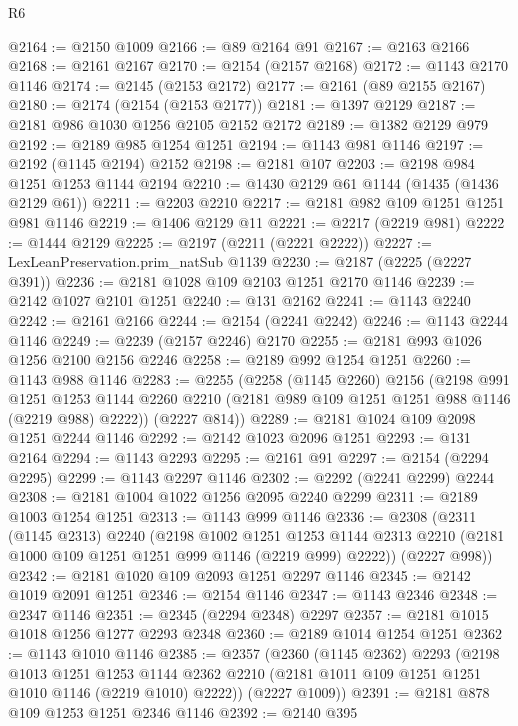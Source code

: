 \begin{lexlean}{R6}
\begin{coremodule}
@2164 := @2150 @1009
@2166 := @89 @2164 @91
@2167 := @2163 @2166
@2168 := @2161 @2167
@2170 := @2154 (@2157 @2168)
@2172 := @1143 @2170 @1146
@2174 := @2145 (@2153 @2172)
@2177 := @2161 (@89 @2155 @2167)
@2180 := @2174 (@2154 (@2153 @2177))
@2181 := @1397 @2129
@2187 := @2181 @986 @1030 @1256 @2105 @2152 @2172
@2189 := @1382 @2129 @979
@2192 := @2189 @985 @1254 @1251
@2194 := @1143 @981 @1146
@2197 := @2192 (@1145 @2194) @2152
@2198 := @2181 @107
@2203 := @2198 @984 @1251 @1253 @1144 @2194
@2210 := @1430 @2129 @61 @1144 (@1435 (@1436 @2129 @61))
@2211 := @2203 @2210
@2217 := @2181 @982 @109 @1251 @1251 @981 @1146
@2219 := @1406 @2129 @11
@2221 := @2217 (@2219 @981)
@2222 := @1444 @2129
@2225 := @2197 (@2211 (@2221 @2222))
@2227 := LexLeanPreservation.prim_natSub @1139
@2230 := @2187 (@2225 (@2227 @391))
@2236 := @2181 @1028 @109 @2103 @1251 @2170 @1146
@2239 := @2142 @1027 @2101 @1251
@2240 := @131 @2162
@2241 := @1143 @2240
@2242 := @2161 @2166
@2244 := @2154 (@2241 @2242)
@2246 := @1143 @2244 @1146
@2249 := @2239 (@2157 @2246) @2170
@2255 := @2181 @993 @1026 @1256 @2100 @2156 @2246
@2258 := @2189 @992 @1254 @1251
@2260 := @1143 @988 @1146
@2283 := @2255
    (@2258
      (@1145 @2260)
      @2156
      (@2198
        @991
        @1251
        @1253
        @1144
        @2260
        @2210
        (@2181 @989 @109 @1251 @1251 @988 @1146 (@2219 @988) @2222))
      (@2227 @814))
@2289 := @2181 @1024 @109 @2098 @1251 @2244 @1146
@2292 := @2142 @1023 @2096 @1251
@2293 := @131 @2164
@2294 := @1143 @2293
@2295 := @2161 @91
@2297 := @2154 (@2294 @2295)
@2299 := @1143 @2297 @1146
@2302 := @2292 (@2241 @2299) @2244
@2308 := @2181 @1004 @1022 @1256 @2095 @2240 @2299
@2311 := @2189 @1003 @1254 @1251
@2313 := @1143 @999 @1146
@2336 := @2308
    (@2311
      (@1145 @2313)
      @2240
      (@2198
        @1002
        @1251
        @1253
        @1144
        @2313
        @2210
        (@2181 @1000 @109 @1251 @1251 @999 @1146 (@2219 @999) @2222))
      (@2227 @998))
@2342 := @2181 @1020 @109 @2093 @1251 @2297 @1146
@2345 := @2142 @1019 @2091 @1251
@2346 := @2154 @1146
@2347 := @1143 @2346
@2348 := @2347 @1146
@2351 := @2345 (@2294 @2348) @2297
@2357 := @2181 @1015 @1018 @1256 @1277 @2293 @2348
@2360 := @2189 @1014 @1254 @1251
@2362 := @1143 @1010 @1146
@2385 := @2357
    (@2360
      (@1145 @2362)
      @2293
      (@2198
        @1013
        @1251
        @1253
        @1144
        @2362
        @2210
        (@2181 @1011 @109 @1251 @1251 @1010 @1146 (@2219 @1010) @2222))
      (@2227 @1009))
@2391 := @2181 @878 @109 @1253 @1251 @2346 @1146
@2392 := @2140 @395

\end{coremodule}
\end{lexlean}
